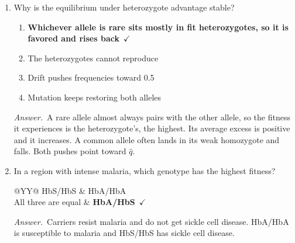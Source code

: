 \documentclass[11pt]{article}
\newcommand{\keyans}[1]{\par\medskip\noindent\textit{Answer.}\ #1\par\medskip}
\begin{document}
\begin{enumerate}[label=\textbf{\arabic*.}, leftmargin=2em, itemsep=1.4em]
\begin{tabularx}{\linewidth}{@{}YYYY@{}}
\end{tabularx}
\keyans{Divide by 5. \(W\) = 0.6, 1, 0.8, so \(s_1\) = 0.4 for B1B1 and \(s_2\) = 0.2 for B2B2. With \(q\) = freq(B2), \(\hat{q}\) = \(s_1\)/(\(s_1\) + \(s_2\)) = 0.4/0.6 = 0.667. The 0.333 swaps \(s_1\) and \(s_2\). Logic check, B1B1 is hurt more, so B1 should be rarer and B2 more common.}
\item Why is the equilibrium under heterozygote advantage stable?
\nopagebreak\par{}
\par\smallskip
\begin{enumerate}[label={}, leftmargin=2.4em, labelwidth=0pt, itemsep=2pt, topsep=0pt]
\item \hspace*{-2.4em}\textbf{Whichever allele is rare sits mostly in fit heterozygotes, so it is favored and rises back}\ \(\checkmark\)
\item \hspace*{-2.4em}The heterozygotes cannot reproduce
\item \hspace*{-2.4em}Drift pushes frequencies toward 0.5
\item \hspace*{-2.4em}Mutation keeps restoring both alleles
\end{enumerate}
\keyans{A rare allele almost always pairs with the other allele, so the fitness it experiences is the heterozygote's, the highest. Its average excess is positive and it increases. A common allele often lands in its weak homozygote and falls. Both pushes point toward \(\hat{q}\).}
\item In a region with intense malaria, which genotype has the highest fitness?
\nopagebreak\par{}
\par\smallskip\noindent\begin{tabularx}{\linewidth}{@{}YY@{}}
HbS/HbS & HbA/HbA \\[3pt]
All three are equal & \textbf{HbA/HbS}\ \(\checkmark\) \\
\end{tabularx}
\keyans{Carriers resist malaria and do not get sickle cell disease. HbA/HbA is susceptible to malaria and HbS/HbS has sickle cell disease.}

\end{enumerate}
\end{document}
